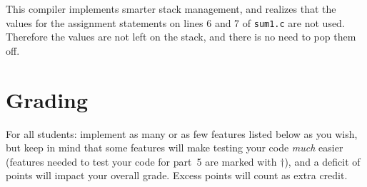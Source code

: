 \documentclass{article}
\newcommand{\flowgen}{5}
\begin{document}
This compiler implements smarter stack management,
and realizes that the values for the assignment statements
on lines 6 and 7 of {\tt sum1.c} are not used.
Therefore the values are not left on the stack,
and there is no need to pop them off.





\section{Grading} \label{SEC:grading}

For all students: implement as many or as few features listed below as you wish,
but keep in mind that some features will make testing your code \emph{much}
easier (features needed to test your code for part~\flowgen{}
are marked with $\dagger$),
and a deficit of points will impact your overall grade.
Excess points will count as extra credit.
\end{document}
